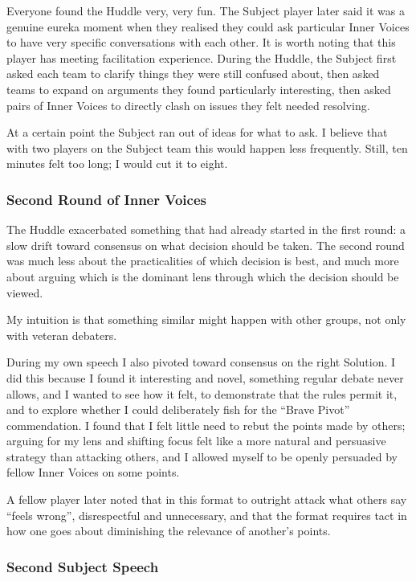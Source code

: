 Everyone found the Huddle very, very fun. The Subject player later said it was a genuine eureka moment when they realised they could ask particular Inner Voices to have very specific conversations with each other. It is worth noting that this player has meeting facilitation experience. During the Huddle, the Subject first asked each team to clarify things they were still confused about, then asked teams to expand on arguments they found particularly interesting, then asked pairs of Inner Voices to directly clash on issues they felt needed resolving.

At a certain point the Subject ran out of ideas for what to ask. I believe that with two players on the Subject team this would happen less frequently. Still, ten minutes felt too long; I would cut it to eight.

\subsubsection{Second Round of Inner Voices}

The Huddle exacerbated something that had already started in the first round: a slow drift toward consensus on what decision should be taken. The second round was much less about the practicalities of which decision is best, and much more about arguing which is the dominant lens through which the decision should be viewed.

My intuition is that something similar might happen with other groups, not only with veteran debaters.

During my own speech I also pivoted toward consensus on the right Solution. I did this because I found it interesting and novel, something regular debate never allows, and I wanted to see how it felt, to demonstrate that the rules permit it, and to explore whether I could deliberately fish for the ``Brave Pivot'' commendation. I found that I felt little need to rebut the points made by others; arguing for my lens and shifting focus felt like a more natural and persuasive strategy than attacking others, and I allowed myself to be openly persuaded by fellow Inner Voices on some points.

A fellow player later noted that in this format to outright attack what others say ``feels wrong'', disrespectful and unnecessary, and that the format requires tact in how one goes about diminishing the relevance of another's points.

\subsubsection{Second Subject Speech}

